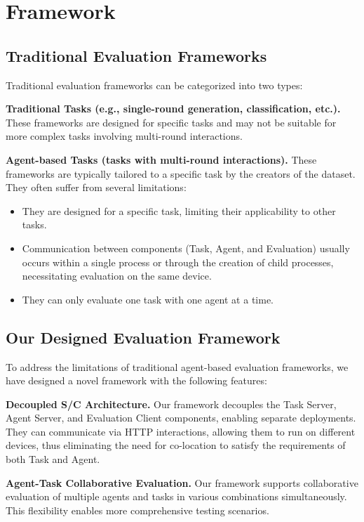 \section{Framework}

\label{app:framework}

\subsection{Traditional Evaluation Frameworks}

Traditional evaluation frameworks can be categorized into two types:

\textbf{Traditional Tasks (e.g., single-round generation, classification, etc.).} 
These frameworks are designed for specific tasks and may not be suitable for more complex tasks involving multi-round interactions.

\textbf{Agent-based Tasks (tasks with multi-round interactions).}
These frameworks are typically tailored to a specific task by the creators of the dataset. They often suffer from several limitations:

\begin{itemize}
    \item They are designed for a specific task, limiting their applicability to other tasks.
    \item Communication between components (Task, Agent, and Evaluation) usually occurs within a single process or through the creation of child processes, necessitating evaluation on the same device.
    \item They can only evaluate one task with one agent at a time.
\end{itemize}

\subsection{Our Designed Evaluation Framework}

To address the limitations of traditional agent-based evaluation frameworks, we have designed a novel framework with the following features:

\textbf{Decoupled S/C Architecture.} Our framework decouples the Task Server, Agent Server, and Evaluation Client components, enabling separate deployments. They can communicate via HTTP interactions, allowing them to run on different devices, thus eliminating the need for co-location to satisfy the requirements of both Task and Agent.

\textbf{Agent-Task Collaborative Evaluation.} Our framework supports collaborative evaluation of multiple agents and tasks in various combinations simultaneously. This flexibility enables more comprehensive testing scenarios.

